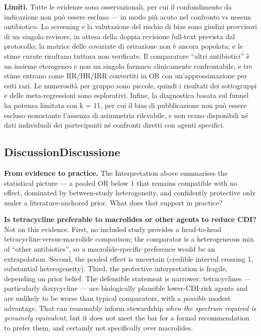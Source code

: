 \documentclass[
  letterpaper,
  DIV=11,
  numbers=noendperiod]{scrartcl}
\begin{document}
\textbf{Limiti.} Tutte le evidenze sono osservazionali, per cui il
confondimento da indicazione non può essere escluso --- in modo più
acuto nel confronto vs nessun antibiotico. Lo screening e la valutazione
del rischio di bias sono giudizi provvisori di un singolo revisore, in
attesa della doppia revisione full-text prevista dal protocollo; la
matrice delle covariate di estrazione non è ancora popolata; e le stime
curate risultano tuttora non verificate. Il comparatore ``altri
antibiotici'' è un insieme eterogeneo e non un singolo farmaco
clinicamente confrontabile, e tre stime entrano come RR/HR/IRR
convertiti in OR con un'approssimazione per esiti rari. Le numerosità
per gruppo sono piccole, quindi i risultati dei sottogruppi e delle
meta-regressioni sono esplorativi. Infine, la diagnostica basata sul
funnel ha potenza limitata con k = 11, per cui il bias di pubblicazione
non può essere escluso nonostante l'assenza di asimmetria rilevabile, e
non erano disponibili né dati individuali dei partecipanti né confronti
diretti con agenti specifici.

\subsection{\texorpdfstring{{Discussion}{Discussione}}{DiscussionDiscussione}}\label{discussiondiscussione}

\textbf{From evidence to practice.} The Interpretation above summarises
the statistical picture --- a pooled OR below 1 that remains compatible
with no effect, dominated by between-study heterogeneity, and
confidently protective only under a literature-anchored prior. What does
that support in practice?

\textbf{Is tetracycline preferable to macrolides or other agents to
reduce CDI?} Not on this evidence. First, no included study provides a
head-to-head tetracycline-versus-macrolide comparison; the comparator is
a heterogeneous mix of ``other antibiotics'', so a macrolide-specific
preference would be an extrapolation. Second, the pooled effect is
uncertain (credible interval crossing 1, substantial heterogeneity).
Third, the protective interpretation is fragile, depending on prior
belief. The defensible statement is narrower: tetracyclines ---
particularly doxycycline --- are biologically plausible lower-CDI-risk
agents and are unlikely to be worse than typical comparators, with a
\emph{possible} modest advantage. That can reasonably inform stewardship
\emph{when the spectrum required is genuinely equivalent}, but it does
not meet the bar for a formal recommendation to prefer them, and
certainly not specifically over macrolides.
\end{document}
